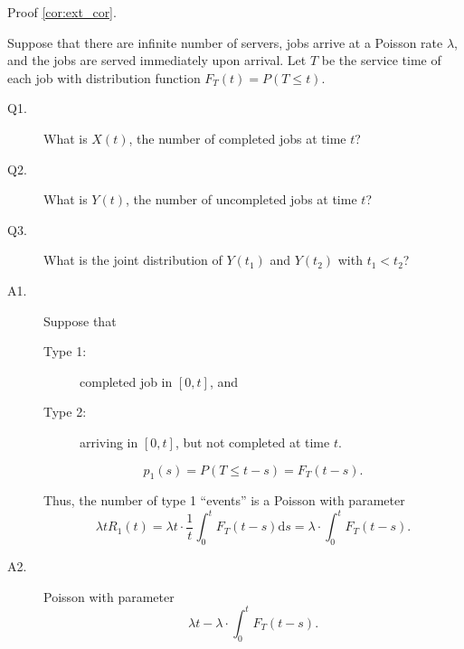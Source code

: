 \begin{exercise}
Proof \autoref{cor:ext_cor}.
\end{exercise}

\begin{example}
Suppose that there are infinite number of servers, jobs arrive at a Poisson rate $ \lambda $, and the jobs are served immediately upon arrival. Let $ T $ be the service time of each job with distribution function $ F_{T}(t) = P(T \le t) $.
\begin{description}
  \item[Q1.] What is $ X(t) $, the number of completed jobs at time $ t $?
  \item[Q2.] What is $ Y(t) $, the number of uncompleted jobs at time $ t $?
  \item[Q3.] What is the joint distribution of $ Y(t_{1}) $ and $ Y(t_{2}) $ with $ t_{1} < t_{2} $?
\end{description}

\begin{description}
\item[A1.] Suppose that
\begin{description}
  \item[Type 1:] completed job in $ [0, t] $, and
  \item[Type 2:] arriving in $ [0, t] $, but not completed at time $ t $.
\end{description}
\[ p_{1}(s) = P(T \le t - s) = F_{T}(t - s). \]

Thus, the number of type 1 ``events'' is a Poisson with parameter
\[ \lambda tR_{1}(t) = \lambda t \cdot \frac{1}{t} \int_{0}^{t} F_{T}(t - s) \mathrm{d}s = \lambda \cdot \int_{0}^{t} F_{T}(t - s). \]

\item[A2.] Poisson with parameter
\[ \lambda t - \lambda \cdot \int_{0}^{t} F_{T}(t - s). \]


\end{description}
\end{example}
